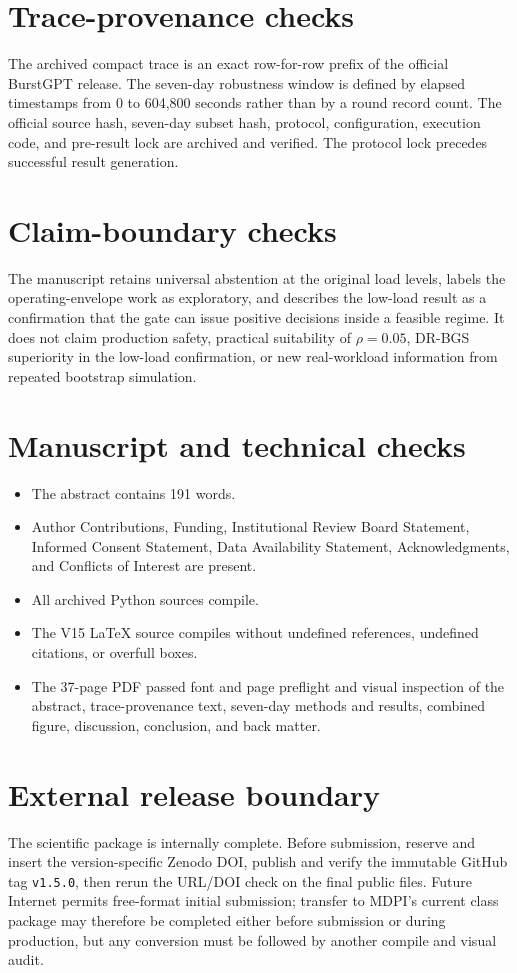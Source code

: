 \documentclass[11pt]{article}
\begin{document}
\section*{Trace-provenance checks}
The archived compact trace is an exact row-for-row prefix of the official BurstGPT release. The seven-day robustness window is defined by elapsed timestamps from 0 to 604,800 seconds rather than by a round record count. The official source hash, seven-day subset hash, protocol, configuration, execution code, and pre-result lock are archived and verified. The protocol lock precedes successful result generation.

\section*{Claim-boundary checks}
The manuscript retains universal abstention at the original load levels, labels the operating-envelope work as exploratory, and describes the low-load result as a confirmation that the gate can issue positive decisions inside a feasible regime. It does not claim production safety, practical suitability of $\rho=0.05$, DR-BGS superiority in the low-load confirmation, or new real-workload information from repeated bootstrap simulation.

\section*{Manuscript and technical checks}
\begin{itemize}
\item The abstract contains 191 words.
\item Author Contributions, Funding, Institutional Review Board Statement, Informed Consent Statement, Data Availability Statement, Acknowledgments, and Conflicts of Interest are present.
\item All archived Python sources compile.
\item The V15 LaTeX source compiles without undefined references, undefined citations, or overfull boxes.
\item The 37-page PDF passed font and page preflight and visual inspection of the abstract, trace-provenance text, seven-day methods and results, combined figure, discussion, conclusion, and back matter.
\end{itemize}

\section*{External release boundary}
The scientific package is internally complete. Before submission, reserve and insert the version-specific Zenodo DOI, publish and verify the immutable GitHub tag \texttt{v1.5.0}, then rerun the URL/DOI check on the final public files. Future Internet permits free-format initial submission; transfer to MDPI's current class package may therefore be completed either before submission or during production, but any conversion must be followed by another compile and visual audit.
\end{document}
